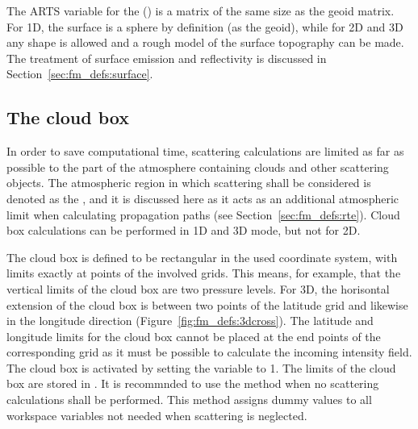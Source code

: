 The ARTS variable for the 
() is a matrix of the same size as the geoid
matrix. For 1D, the surface is a sphere by definition (as the geoid),
while for 2D and 3D any shape is allowed and a rough model of the
surface topography can be made. The treatment of surface emission
and reflectivity is discussed in Section~\ref{sec:fm_defs:surface}.


\subsection{The cloud box}
\label{sec:fm_defs:cloudbox}

In order to save computational time, scattering calculations are
limited as far as possible to the part of the atmosphere containing
clouds and other scattering objects. The atmospheric region in which
scattering shall be considered is denoted as the , and it is discussed here as it acts as an additional
atmospheric limit when calculating propagation paths (see
Section~\ref{sec:fm_defs:rte}). Cloud box calculations can be
performed in 1D and 3D mode, but not for 2D.

The cloud box is defined to be rectangular in the used coordinate
system, with limits exactly at points of the involved grids. This
means, for example, that the vertical limits of the cloud box are two
pressure levels. For 3D, the horisontal extension of the cloud box
is between two points of the latitude grid and likewise in the
longitude direction (Figure~\ref{fig:fm_defs:3dcross}). The latitude
and longitude limits for the cloud box cannot be placed at the end
points of the corresponding grid as it must be possible to calculate
the incoming intensity field. The cloud box is activated by setting
the variable  to 1.  The limits of the cloud
box are stored in .  It is recommnded to
use the method  when no scattering calculations
shall be performed. This method assigns dummy values to all workspace
variables not needed when scattering is neglected.

